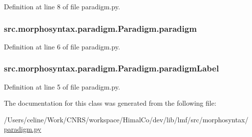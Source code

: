 Definition at line 8 of file paradigm.\+py.

\hypertarget{classsrc_1_1morphosyntax_1_1paradigm_1_1_paradigm_aef28fdb51b77696c54e77470db8fc9ae}{
\subsubsection[{paradigm}]{\setlength{\rightskip}{0pt plus 5cm}src.\+morphosyntax.\+paradigm.\+Paradigm.\+paradigm}}\label{classsrc_1_1morphosyntax_1_1paradigm_1_1_paradigm_aef28fdb51b77696c54e77470db8fc9ae}


Definition at line 6 of file paradigm.\+py.

\hypertarget{classsrc_1_1morphosyntax_1_1paradigm_1_1_paradigm_a53996d262b7c39f45cf3daec60ff0e39}{
\subsubsection[{paradigm\+Label}]{\setlength{\rightskip}{0pt plus 5cm}src.\+morphosyntax.\+paradigm.\+Paradigm.\+paradigm\+Label}}\label{classsrc_1_1morphosyntax_1_1paradigm_1_1_paradigm_a53996d262b7c39f45cf3daec60ff0e39}


Definition at line 5 of file paradigm.\+py.



The documentation for this class was generated from the following file\+:\begin{DoxyCompactItemize}
\item 
/\+Users/celine/\+Work/\+C\+N\+R\+S/workspace/\+Himal\+Co/dev/lib/lmf/src/morphosyntax/\hyperlink{paradigm_8py}{paradigm.\+py}\end{DoxyCompactItemize}
